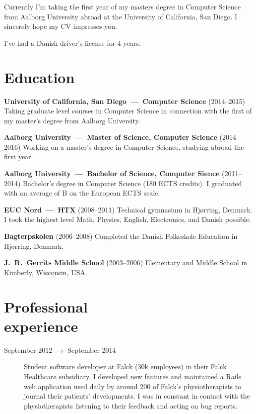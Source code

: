 \documentclass[margin,line]{resume}
\begin{document}
\begin{resume}
    Currently I'm taking the first year of my masters degree in
    Computer Science from Aalborg University abroad at the University
    of California, San Diego. I sincerely hope my CV impresses you.
    
    I've had a Danish driver's license for 4 years.

    \section{\mysidestyle{} Education}

    \textbf{University of California, San Diego~---~Computer Science}
    (2014--2015) Taking graduate level courses in Computer Science
    in connection with the first of my master's degree from Aalborg
    University.

    \textbf{Aalborg University~---~Master of Science, Computer Science}
    (2014--2016) Working on a master's degree in Computer
    Science, studying abroad the first year.

    \textbf{Aalborg University~---~Bachelor of Science, Computer Sience}
    (2011--2014) Bachelor's degree in Computer Science (180 ECTS
    credits). I graduated with an average of B on the European ECTS
    scale.      

    \textbf{EUC Nord~---~HTX} (2008--2011) Technical gymnasium in
    Hjørring, Denmark. I took the highest level Math, Physics, English,
    Electronics, and Danish possible.
    
    \textbf{Bagterpskolen} (2006--2008) Completed the Danish
    Folkeskole Education in Hjørring, Denmark.

    \textbf{J.\ R.\ Gerrits Middle School} (2003--2006) Elementary and 
    Middle School in Kimberly, Wisconsin, USA\@.

\section{\mysidestyle{} Professional\\experience}\vspace{1mm}
\begin{description}

  \item[September 2012 $\rightarrow$ September 2014] Student software
  developer at Falck (30k employees) in their Falck Healthcare
  subsidiary. I developed new features and maintained a Rails web
  application used daily by around 200 of Falck's physiotherapists to
  journal their patients' developments. I was in constant in contact
  with the physiotherapists listening to their feedback and acting on
  bug reports.


\end{description}
\end{resume}
\end{document}
